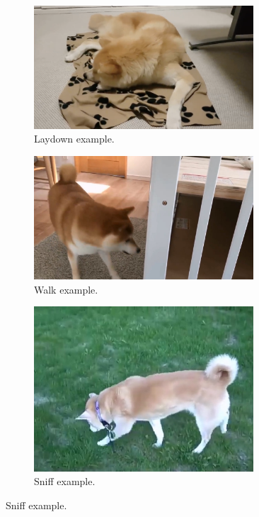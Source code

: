 \documentclass[letterpaper]{article}
\begin{document}
\begin{figure}[h]
\begin{subfigure}[]{0.3\textwidth}
	\centering
	\includegraphics[width=0.9\textwidth]{images/laydown.png}
	\caption{Laydown example.}
\label{fig:act4}
\end{subfigure}
\begin{subfigure}[]{0.3\textwidth}
	\centering
	\includegraphics[width=0.9\textwidth]{images/walk.jpg}
	\caption{Walk example.}
\label{fig:act5}
\end{subfigure}
\begin{subfigure}[]{0.3\textwidth}
	\centering
	\includegraphics[width=0.9\textwidth]{images/sniff.jpg}
	\caption{Sniff example.}
	\label{fig:act6}
\end{subfigure}


\end{figure}
\end{document}
